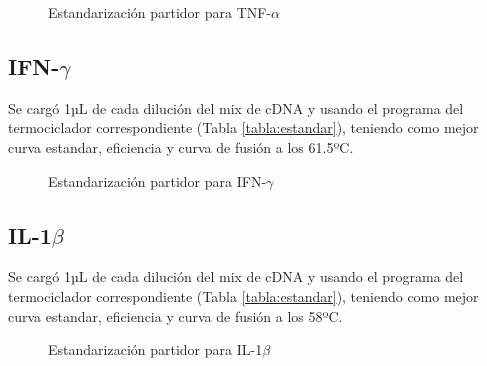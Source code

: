 \documentclass[12pt,a4paper,oneside]{scrbook}
\begin{document}
\begin{figure}[h!]
    \centering
    \caption {Estandarización partidor para TNF-$\alpha$}
    \label {fig:tnfa}
\end{figure}

\subsection{IFN-$\gamma$}

Se cargó 1µL de cada dilución del mix de cDNA y usando el programa del
termociclador correspondiente (Tabla \ref{tabla:estandar}), teniendo
como mejor curva estandar, eficiencia y curva de fusión a los 61.5ºC.

\begin{figure}[h!]
    \centering
    \caption {Estandarización partidor para IFN-$\gamma$}
    \label {fig:ifng}
\end{figure}

\subsection{IL-1$\beta$}

Se cargó 1µL de cada dilución del mix de cDNA y usando el programa del
termociclador correspondiente (Tabla \ref{tabla:estandar}), teniendo
como mejor curva estandar, eficiencia y curva de fusión a los 58ºC.

\begin{figure}[h!]
    \centering
    \caption {Estandarización partidor para IL-1$\beta$}
    \label {fig:il1b}
\end{figure}
\end{document}
